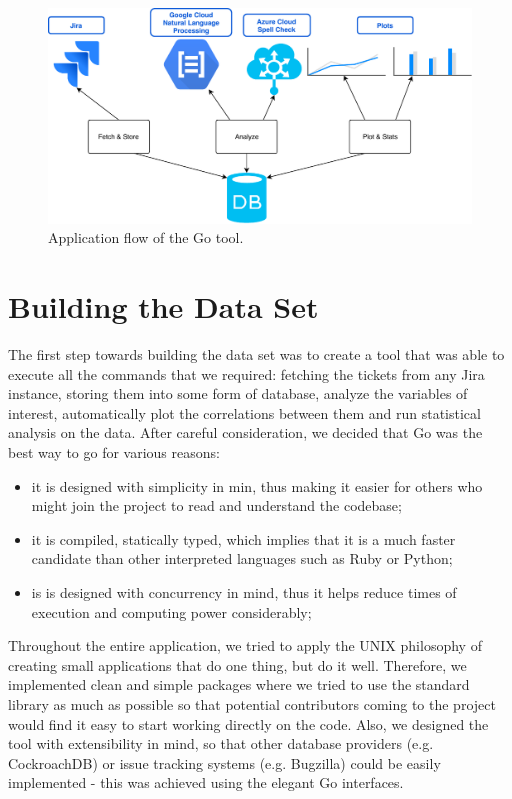 \documentclass{mpaper}
\begin{document}
\begin{figure}
\begin{center}
\includegraphics[width=\textwidth]{images/flow.pdf}
\end{center}
\caption{\label{fig-eg}Application flow of the Go tool.}
\end{figure}

\section{Building the Data Set}\label{building}
The first step towards building the data set was to create a tool that was able to execute all the commands that we required:
fetching the tickets from any Jira instance, storing them into some form of database, analyze the variables of interest, 
automatically plot the correlations between them and run statistical analysis on the data. After careful consideration, 
we decided that Go was the best way to go for various reasons:
  \begin{itemize}
    \item it is designed with simplicity in min, thus making it easier for others who might join the project to read 
    and understand the codebase;
    \item it is compiled, statically typed, which implies that it is a much faster candidate than other interpreted languages
    such as Ruby or Python;
    \item is is designed with concurrency in mind, thus it helps reduce times of execution and computing power considerably;
  \end{itemize}

Throughout the entire application, we tried to apply the UNIX philosophy of creating small applications that do one thing, but 
do it well. Therefore, we implemented clean and simple packages where we tried to use the standard library as much as possible
so that potential contributors coming to the project would find it easy to start working directly on the code. Also, we designed 
the tool with extensibility in mind, so that other database providers (e.g. CockroachDB) or issue tracking systems (e.g. Bugzilla) 
could be easily implemented - this was achieved using the elegant Go interfaces. 
\end{document}
